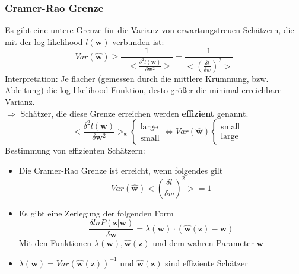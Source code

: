 	\subsubsection{Cramer-Rao Grenze}
	Es gibt eine untere Grenze für die Varianz von erwartungstreuen Schätzern, die mit der log-likelihood $l(\pmb{w})$ verbunden ist:
	\begin{equation*}
		Var(\pmb{\hat{w}}) \ge \frac{1}{-<\frac{\delta^2l(\pmb{w})}{\delta\pmb{w}^2}>} =\frac{1}{<(\frac{\delta l}{\delta w})^2>}
	\end{equation*}
	Interpretation: Je flacher (gemessen durch die mittlere Krümmung, bzw. Ableitung) die log-likelihood Funktion, desto größer die minimal erreichbare Varianz.\\
	$\Rightarrow$ Schätzer, die diese Grenze erreichen werden \textbf{effizient} genannt.
	\begin{equation*}
		-<\frac{\delta^2l(\pmb{w})}{\delta\pmb{w}^2}>_{\pmb{z}} \begin{cases}
		\text{large}\\
		\text{small}
		\end{cases} \Leftrightarrow Var(\pmb{\hat{w}}) \begin{cases}
		\text{small}\\
		\text{large}
		\end{cases}
	\end{equation*}
	Bestimmung von effizienten Schätzern:
	\begin{itemize}
		\item Die Cramer-Rao Grenze ist erreicht, wenn folgendes gilt
		\begin{equation*}
			Var(\pmb{\hat{w}}) <(\frac{\delta l}{\delta w})^2> = 1
		\end{equation*}
		\item Es gibt eine Zerlegung der folgenden Form
		\begin{equation*}
			\frac{\delta lnP(\pmb{z}\vert \pmb{w})}{\delta \pmb{w}} = \lambda(\pmb{w}) \cdot (\pmb{\hat{w}}(\pmb{z})-\pmb{w})
		\end{equation*}
		Mit den Funktionen $\lambda(\pmb{w}), \pmb{\hat{w}}(\pmb{z})$ und dem wahren Parameter $\pmb{w}$
		\item $\lambda(\pmb{w}) = Var(\pmb{\hat{w}}(\pmb{z}))^{-1}$ und $\pmb{\hat{w}}(\pmb{z})$ sind effiziente Schätzer
	\end{itemize}
